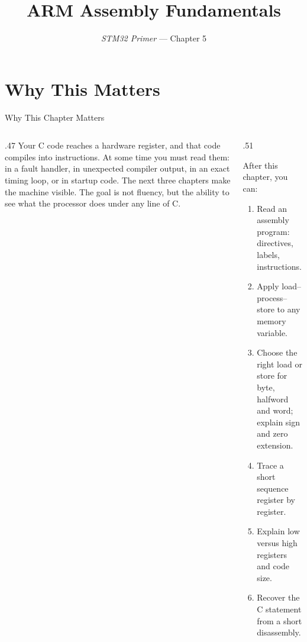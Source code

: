\documentclass[9pt,aspectratio=169,xcolor=table]{beamer}
\title{ARM Assembly Fundamentals}
\subtitle{\emph{STM32 Primer} --- Chapter 5}
\begin{document}
\titlepage

\section{Why This Matters}

\begin{frame}{Why This Chapter Matters}
    \begin{columns}[c]
    \begin{column}{.47\textwidth}
        {\normalsize Your C code reaches a hardware register, and that code compiles into instructions. At some time you must read them: in a fault handler, in unexpected compiler output, in an exact timing loop, or in startup code. The next three chapters make the machine visible. The goal is not fluency, but the ability to see what the processor does under any line of C.}
    \end{column}
    \begin{column}{.51\textwidth}
        \begin{block}{After this chapter, you can:}
        {\small
        \begin{enumerate}\itemsep2pt
            \item Read an assembly program: directives, labels, instructions.
            \item Apply load--process--store to any memory variable.
            \item Choose the right load or store for byte, halfword and word; explain sign and zero extension.
            \item Trace a short sequence register by register.
            \item Explain low versus high registers and code size.
            \item Recover the C statement from a short disassembly.
        \end{enumerate}}
        \end{block}
    \end{column}
    \end{columns}
\end{frame}
\end{document}
